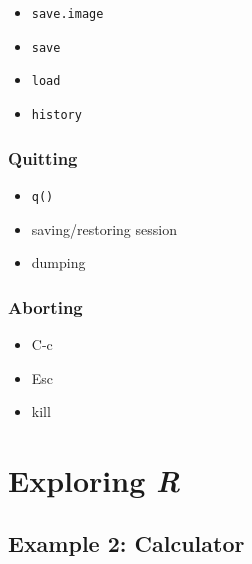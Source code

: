 \documentclass[10pt,letterpaper]{article}
\begin{document}
\begin{itemize}
    \item \texttt{save.image}
    \item \texttt{save}
    \item \texttt{load}
    \item \texttt{history}
\end{itemize}



\subsubsection{Quitting} %
\label{ssub:quitting}

\begin{itemize}
    \item \texttt{q()}
    \item saving/restoring session
    \item dumping
\end{itemize}


\subsubsection{Aborting} %
\label{ssub:aborting}

\begin{itemize}
    \item C-c
    \item Esc
    \item kill
\end{itemize}



\section{Exploring \emph{R}} %
\label{sec:exploring_r}

\subsection{Example 2: Calculator} %
\label{sub:example_2_calculator}
\end{document}
